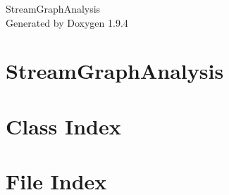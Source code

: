 \documentclass[twoside]{book}
\newcommand{\+}{\discretionary{\mbox{\scriptsize$\hookleftarrow$}}{}{}}
\newcommand{\clearemptydoublepage}{%
    \newpage{\pagestyle{empty}\cleardoublepage}%
  }
\begin{document}
  \raggedbottom
    \hypersetup{pageanchor=false,
                bookmarksnumbered=true,
                pdfencoding=unicode
               }
  \begin{titlepage}
  \vspace*{7cm}
  \begin{center}%
  {\Large Stream\+Graph\+Analysis}\\
  \vspace*{1cm}
  {\large Generated by Doxygen 1.9.4}\\
  \end{center}
  \end{titlepage}
  \clearemptydoublepage
  \tableofcontents
  \clearemptydoublepage
  \hypersetup{pageanchor=true}
\chapter{Stream\+Graph\+Analysis}
\label{index}\hypertarget{index}{}
\chapter{Class Index}

\chapter{File Index}

\end{document}
